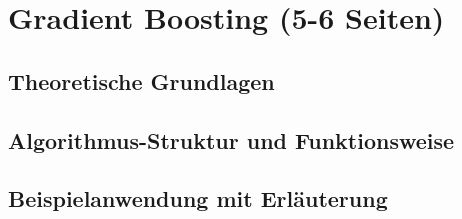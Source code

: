 \section{Gradient Boosting (5-6 Seiten)}
\subsection{Theoretische Grundlagen}
\subsection{Algorithmus-Struktur und Funktionsweise}
\subsection{Beispielanwendung mit Erläuterung}
